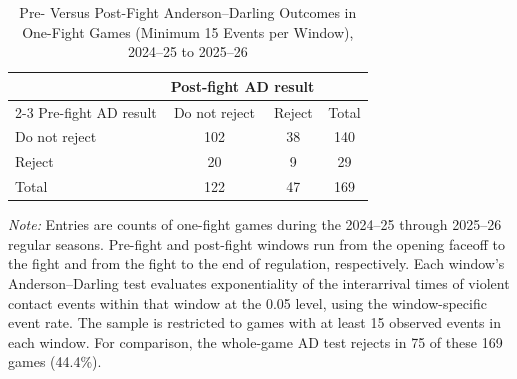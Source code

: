 \begin{table}[htbp]
\centering
\caption{Pre- Versus Post-Fight Anderson--Darling Outcomes in One-Fight Games (Minimum 15 Events per Window), 2024--25 to 2025--26}
\label{tab:one_fight_AD_rejection_min_15_20242025_20252026}
\small
\renewcommand{\arraystretch}{1.15}
\setlength{\tabcolsep}{6pt}

\begin{tabular*}{0.78\textwidth}{@{\extracolsep{\fill}}lccc}
\toprule
 & \multicolumn{2}{c}{Post-fight AD result} & \\
\cmidrule(lr){2-3}
Pre-fight AD result & Do not reject & Reject & Total \\
\midrule
Do not reject & 102 & 38 & 140 \\
Reject & 20 & 9 & 29 \\
\midrule
Total & 122 & 47 & 169 \\
\bottomrule
\end{tabular*}

\vspace{0.4em}
\parbox{0.78\textwidth}{
\footnotesize
\textit{Note:} Entries are counts of one-fight games during the 2024--25 through 2025--26 regular seasons. Pre-fight and post-fight windows run from the opening faceoff to the fight and from the fight to the end of regulation, respectively. Each window's Anderson--Darling test evaluates exponentiality of the interarrival times of violent contact events within that window at the 0.05 level, using the window-specific event rate. The sample is restricted to games with at least 15 observed events in each window. For comparison, the whole-game AD test rejects in 75 of these 169 games (44.4\%).
}
\end{table}
